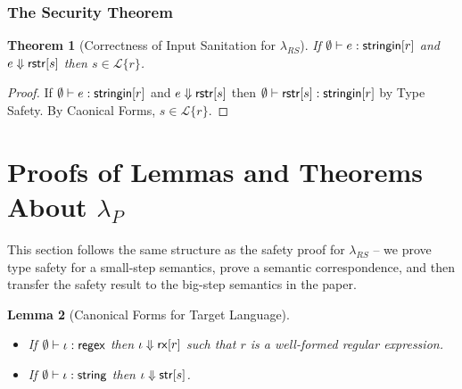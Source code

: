 \documentclass[11pt,leqno]{article}
\newtheorem{thm}{Theorem}
\newtheorem{lem}[thm]{Lemma}
\theoremstyle{definition}
\newcommand{\Lagr}{\mathcal{L}}
\newcommand{\lang}[1]{\Lagr\{#1\}}
\newcommand{\lambdas}{\lambda_{RS}}
\newcommand{\lambdap}{\lambda_P}
\newcommand{\stringin}[1]{{\sf stringin}[#1]}
\renewcommand{\tstr}[1]{{{\sf str}[#1]}}
\newcommand{\rx}[1]{ {\sf rx}[#1] }
\newcommand{\str}{{\sf string}}
\newcommand{\regex}{{\sf regex}}
\newcommand{\treduces}{ \Downarrow }
\newcommand{\sreduces}{ \Downarrow }
\begin{document}
\subsubsection{The Security Theorem}\label{sec:securitythm}

\begin{thm}[Correctness of Input Sanitation for $\lambdas$]\label{thm:scorrect}
  If  $\emptyset \vdash e : \stringin{r}$ and $e \sreduces \rstr{s}$ then $s \in \lang{r}$.
\end{thm}
\begin{proof}
If $\emptyset \vdash e : \stringin{r}$ and $e \sreduces \rstr{s}$ then $\emptyset \vdash \rstr{s} : \stringin{r}$ by Type Safety.
By Caonical Forms, $s \in \lang{r}$.
\end{proof}


\section{Proofs of Lemmas and Theorems About $\lambdap$}

This section follows the same structure as the safety proof for $\lambdas$ --
we prove type safety for a small-step semantics, prove a semantic correspondence,
and then transfer the safety result to the big-step semantics in the paper.

\begin{lem}[Canonical Forms for Target Language]
~
\begin{itemize}
\item 
If $\emptyset \vdash \iota : \regex$ then $\iota \treduces \rx{r}$ such that $r$ is a well-formed regular expression. 
\item 
If $\emptyset \vdash \iota : \str$ then $\iota \treduces \tstr{s}$.
\end{itemize}
\end{lem}
\end{document}
